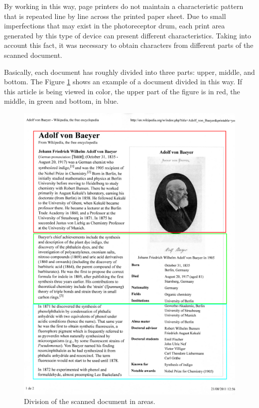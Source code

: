 \documentclass[10pt,twocolumn,letterpaper]{article}
\begin{document}
By working in this way, page printers do not maintain a characteristic pattern that is repeated line by line across the printed paper sheet. Due to small imperfections that may exist in the photoreceptor drum, each print area generated by this type of device can present different characteristics.
Taking into account this fact, it was necessary to obtain characters from different parts of the scanned document. 

Basically, each document has roughly divided into three parts: upper, middle, and bottom. The Figure \ref{fig:document_areas} shows an example of a document divided in this way. If this article is being viewed in color, the upper part of the figure is in red, the middle, in green and bottom, in blue.

\begin{figure}
\begin{center}
	\includegraphics[width=0.99\columnwidth]{document_areas}
	\caption{Division of the scanned document in areas.}
\label{fig:document_areas}   
\end{center} 
\end{figure}
\end{document}
